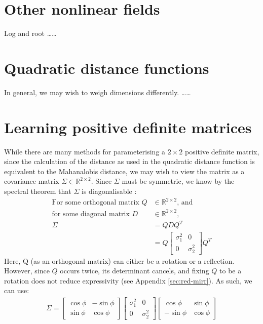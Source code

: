 \documentclass[a4paper, 12pt]{report}
\def\comment#1{\color{red}#1\color{black}}
\begin{document}
\newpage
\section{Other nonlinear fields}
Log and root \cite{bellaardaxiomatic} \comment{\ldots\ldots}

\section{Quadratic distance functions}
In general, we may wish to weigh dimensions differently. \cite{Boomgaard1999NumericalSS} \comment{\ldots\ldots}

\newpage
\section{Learning positive definite matrices}
\label{sec:learning-pdm}
While there are many methods for parameterising a $2\times2$ positive definite matrix, since the calculation of the distance as used in the quadratic distance function is equivalent to the Mahanalobis distance, we may wish to view the matrix as a covariance matrix $\Sigma \in \mathbb{R}^{2\times2}$. Since $\Sigma$ must be symmetric, we know by the spectral theorem that $\Sigma$ is diagonalisable \cite{poole2015linear}:
\begin{align}
\textrm{For some orthogonal matrix }Q &\in \mathbb{R}^{2\times 2} \textrm{, and} \nonumber \\
\textrm{for some diagonal matrix }D &\in \mathbb{R}^{2\times 2} \textrm{,}\nonumber \\
\Sigma &= QDQ^T\\
&= Q \begin{bmatrix}
	 \sigma_1^2 & 0\\ 0 &  \sigma_2^2
\end{bmatrix} Q^T
\end{align}
Here, Q (as an orthogonal matrix) can either be a rotation  or a reflection. However, since $Q$ occurs twice, its determinant cancels, and fixing $Q$ to be a rotation does not reduce expressivity (see Appendix \ref{sec:red-mirr}). As such, we can use:
\begin{align}
\Sigma = \begin{bmatrix}
	\cos \phi & -\sin \phi \\ \sin\phi & \cos\phi
\end{bmatrix}\begin{bmatrix}
	 \sigma_1^2 & 0\\ 0 &  \sigma_2^2
\end{bmatrix} \begin{bmatrix}
	\cos \phi & \sin \phi \\ -\sin\phi & \cos\phi
\end{bmatrix}
\end{align}
\end{document}
